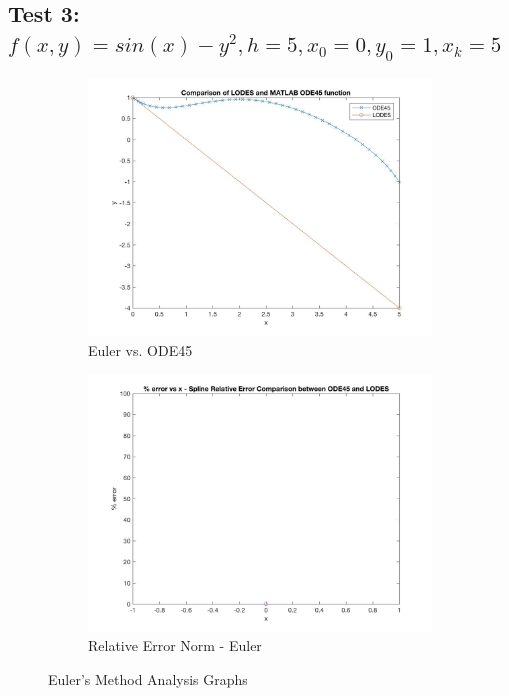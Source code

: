 \documentclass[12pt, titlepage]{article}
\begin{document}
\subsection{Test 3: $f(x,y) = sin(x) - y^2, h = 5,x_0 = 0,y_0 = 1,x_k = 5$} \label{sec_t3}
\begin{figure}[H]
\centering
\begin{subfigure}{.55\textwidth}
  \centering
  \includegraphics[width=\linewidth]{images/Test3/1LODESvsMATLABPlot.jpg}
  \caption{Euler vs. ODE45}
  \label{fig:euler3a}
\end{subfigure}%
\begin{subfigure}{.55\textwidth}
  \centering
  \includegraphics[width=\linewidth]{images/Test3/1RelativeErrorPlot.jpg}
  \caption{Relative Error Norm - Euler}
  \label{fig:euler3b}
\end{subfigure}
\caption{Euler's Method Analysis Graphs}
\label{fig:euler3}
\end{figure}
\end{document}
